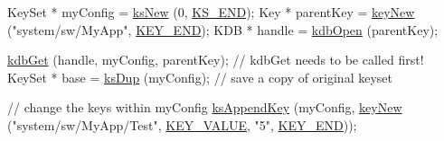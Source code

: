 \begin{DoxyCodeInclude}
KeySet * myConfig = \hyperlink{group__keyset_ga671e1aaee3ae9dc13b4834a4ddbd2c3c}{ksNew} (0, \hyperlink{group__keyset_ga7a28fce3773b2c873c94ac80b8b4cd54}{KS\_END});
Key * parentKey = \hyperlink{group__key_gad23c65b44bf48d773759e1f9a4d43b89}{keyNew} (\textcolor{stringliteral}{"system/sw/MyApp"}, \hyperlink{group__key_gga9b703ca49f48b482def322b77d3e6bc8aa8adb6fcb92dec58fb19410eacfdd403}{KEY\_END});
KDB * handle = \hyperlink{group__kdb_ga6808defe5870f328dd17910aacbdc6ca}{kdbOpen} (parentKey);

\hyperlink{group__kdb_ga28e385fd9cb7ccfe0b2f1ed2f62453a1}{kdbGet} (handle, myConfig, parentKey); \textcolor{comment}{// kdbGet needs to be called first!}
KeySet * base = \hyperlink{group__keyset_gac59e4b328245463f1451f68d5106151c}{ksDup} (myConfig);     \textcolor{comment}{// save a copy of original keyset}

\textcolor{comment}{// change the keys within myConfig}
\hyperlink{group__keyset_gaa5a1d467a4d71041edce68ea7748ce45}{ksAppendKey} (myConfig, \hyperlink{group__key_gad23c65b44bf48d773759e1f9a4d43b89}{keyNew} (\textcolor{stringliteral}{"system/sw/MyApp/Test"}, 
      \hyperlink{group__key_gga9b703ca49f48b482def322b77d3e6bc8ac66e4a49d09212b79f5754ca6db5bd2e}{KEY\_VALUE}, \textcolor{stringliteral}{"5"}, \hyperlink{group__key_gga9b703ca49f48b482def322b77d3e6bc8aa8adb6fcb92dec58fb19410eacfdd403}{KEY\_END}));


\end{DoxyCodeInclude}
